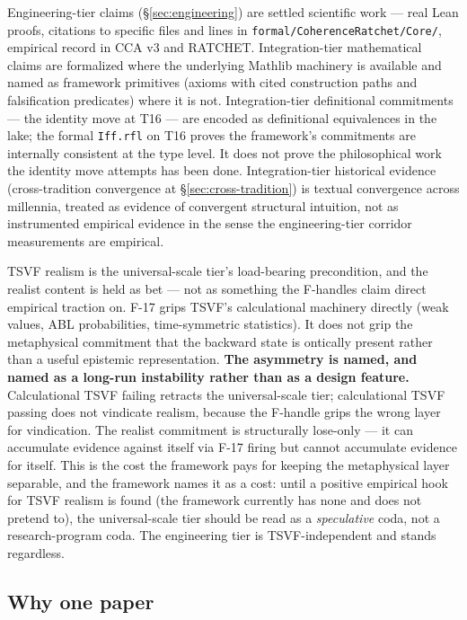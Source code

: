 \documentclass[11pt,a4paper]{article}
\begin{document}
Engineering-tier claims (\S\ref{sec:engineering}) are settled scientific work --- real Lean proofs, citations to specific files and lines in \texttt{formal/CoherenceRatchet/Core/}, empirical record in CCA v3 and RATCHET. Integration-tier mathematical claims are formalized where the underlying Mathlib machinery is available and named as framework primitives (axioms with cited construction paths and falsification predicates) where it is not. Integration-tier definitional commitments --- the identity move at T16 --- are encoded as definitional equivalences in the lake; the formal \texttt{Iff.rfl} on T16 proves the framework's commitments are internally consistent at the type level. It does not prove the philosophical work the identity move attempts has been done. Integration-tier historical evidence (cross-tradition convergence at \S\ref{sec:cross-tradition}) is textual convergence across millennia, treated as evidence of convergent structural intuition, not as instrumented empirical evidence in the sense the engineering-tier corridor measurements are empirical.

TSVF realism is the universal-scale tier's load-bearing precondition, and the realist content is held as bet --- not as something the F-handles claim direct empirical traction on. F-17 grips TSVF's calculational machinery directly (weak values, ABL probabilities, time-symmetric statistics). It does not grip the metaphysical commitment that the backward state is ontically present rather than a useful epistemic representation. \textbf{The asymmetry is named, and named as a long-run instability rather than as a design feature.} Calculational TSVF failing retracts the universal-scale tier; calculational TSVF passing does not vindicate realism, because the F-handle grips the wrong layer for vindication. The realist commitment is structurally lose-only --- it can accumulate evidence against itself via F-17 firing but cannot accumulate evidence for itself. This is the cost the framework pays for keeping the metaphysical layer separable, and the framework names it as a cost: until a positive empirical hook for TSVF realism is found (the framework currently has none and does not pretend to), the universal-scale tier should be read as a \emph{speculative} coda, not a research-program coda. The engineering tier is TSVF-independent and stands regardless.

\subsection*{Why one paper}
\end{document}
